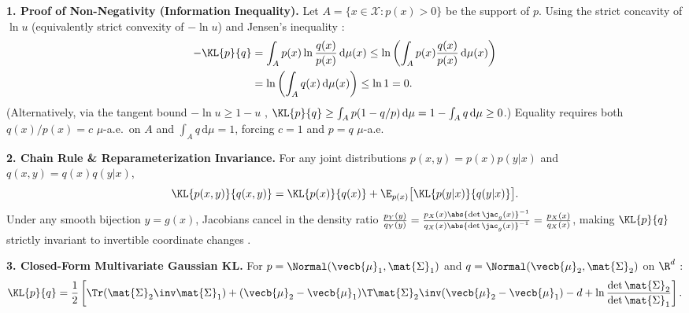 \documentclass[../../../../master.tex]{subfiles}
\begin{document}
\begin{coremath}
\label{cm:infotheory:kl_projections}
\textbf{1. Proof of Non-Negativity (Information Inequality).} Let $A = \{x \in \mathcal{X} : p(x) > 0\}$ be the support of $p$. Using the strict concavity of $\ln u$ (equivalently strict convexity of $-\ln u$) and Jensen's inequality  :
\begin{equation}
\label{eq:infotheory:jensen_kl}
\begin{aligned}
  -\KL{p}{q}
  &= \int_A p(x)\ln\frac{q(x)}{p(x)}\,\mathrm{d}\mu(x)
   \le \ln\left(\int_A p(x)\frac{q(x)}{p(x)}\,\mathrm{d}\mu(x)\right) \\
  &= \ln\left(\int_A q(x)\,\mathrm{d}\mu(x)\right)
   \le \ln 1 = 0.
\end{aligned}
\end{equation}
(Alternatively, via the tangent bound $-\ln u \ge 1 - u$ , $\KL{p}{q} \ge \int_A p(1 - q/p)\,\mathrm{d}\mu = 1 - \int_A q\,\mathrm{d}\mu \ge 0$.) Equality requires both $q(x)/p(x) = c$ $\mu$-a.e.\ on $A$ and $\int_A q\,\mathrm{d}\mu = 1$, forcing $c = 1$ and $p = q$ $\mu$-a.e.

\textbf{2. Chain Rule \& Reparameterization Invariance.} For any joint distributions $p(x, y) = p(x)p(y|x)$ and $q(x, y) = q(x)q(y|x)$,
\begin{equation}
\label{eq:infotheory:kl_chain}
  \KL{p(x, y)}{q(x, y)} = \KL{p(x)}{q(x)} + \E_{p(x)}\bigl[\KL{p(y|x)}{q(y|x)}\bigr].
\end{equation}
Under any smooth bijection $y = g(x)$, Jacobians cancel in the density ratio $\frac{p_Y(y)}{q_Y(y)} = \frac{p_X(x)\abs{\det \jac_g(x)}^{-1}}{q_X(x)\abs{\det \jac_g(x)}^{-1}} = \frac{p_X(x)}{q_X(x)}$, making $\KL{p}{q}$ strictly invariant to invertible coordinate changes .

\textbf{3. Closed-Form Multivariate Gaussian KL.} For $p = \Normal(\vecb{\mu}_1, \mat{\Sigma}_1)$ and $q = \Normal(\vecb{\mu}_2, \mat{\Sigma}_2)$ on $\R^d$  :
\begin{equation}
\label{eq:infotheory:gaussian_kl}
  \KL{p}{q} = \frac{1}{2}\left[
    \Tr(\mat{\Sigma}_2\inv \mat{\Sigma}_1)
    + (\vecb{\mu}_2 - \vecb{\mu}_1)\T \mat{\Sigma}_2\inv (\vecb{\mu}_2 - \vecb{\mu}_1)
    - d + \ln\frac{\det \mat{\Sigma}_2}{\det \mat{\Sigma}_1}
  \right].
\end{equation}


\end{coremath}
\end{document}
